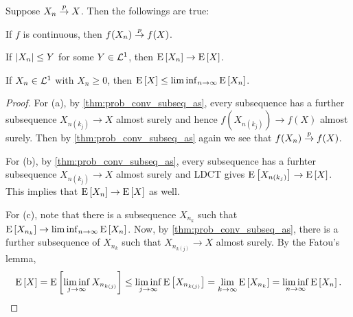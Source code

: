 \begin{corollary}\label{cor:conv_in_prob_conv_thms}
    Suppose $X_n\overset{p}{\to} X$. Then the followings are true: 
    \begin{thmenum}
        \item If $f$ is continuous, then $f(X_n)\overset{p}{\to} f(X)$. 
        \item If $\left\lvert {X_n} \right\rvert\leq Y$ for some $Y\in\mathcal{L}^1$, then $\operatorname{E}\left[ {X_n} \right]\to\operatorname{E}\left[ {X} \right]$. 
        \item If $X_n\in\mathcal{L}^1$ with $X_n\geq 0$, then $\operatorname{E}\left[ {X} \right]\leq \liminf_{n\to\infty}\operatorname{E}\left[ {X_n} \right]$. 
    \end{thmenum}
\end{corollary}
\begin{proof}
    For (a), by \cref{thm:prob_conv_subseq_as}, every subsequence 
    has a further subsequence $X_{n(k_j)}\to X$ almost surely and 
    hence $f(X_{n(k_j)})\to f(X)$ almost surely. Then by \cref{thm:prob_conv_subseq_as} 
    again we see that $f(X_n)\overset{p}{\to} f(X)$. 

    For (b), by \cref{thm:prob_conv_subseq_as}, every subsequence 
    has a furhter subsequence $X_{n(k_j)}\to X$ almost surely and 
    LDCT gives $\operatorname{E}\left[ {X_{n(k_j)}} \right]\to \operatorname{E}\left[ {X} \right]$. This implies 
    that $\operatorname{E}\left[ {X_n} \right]\to \operatorname{E}\left[ {X} \right]$ as well. 

    For (c), note that there is a subsequence $X_{n_k}$ such that $\operatorname{E}\left[ {X_{n_k}} \right]\to 
    \liminf_{n\to\infty}\operatorname{E}\left[ {X_n} \right]$. Now, by \cref{thm:prob_conv_subseq_as}, 
    there is a further subsequence of $X_{n_k}$ such that $X_{n_{k(j)}}\to X$ almost 
    surely. By the Fatou's lemma, 
    \begin{equation*}
        \operatorname{E}\left[ {X} \right] = \operatorname{E}\left[ {\liminf_{j\to\infty} X_{n_{k(j)}}} \right] 
        \leq \liminf_{j\to\infty}\operatorname{E}\left[ {X_{n_{k(j)}}} \right] 
        = \lim_{k\to\infty}\operatorname{E}\left[ {X_{n_k}} \right] = \liminf_{n\to\infty}\operatorname{E}\left[ {X_n} \right]. 
    \end{equation*}
\end{proof}

